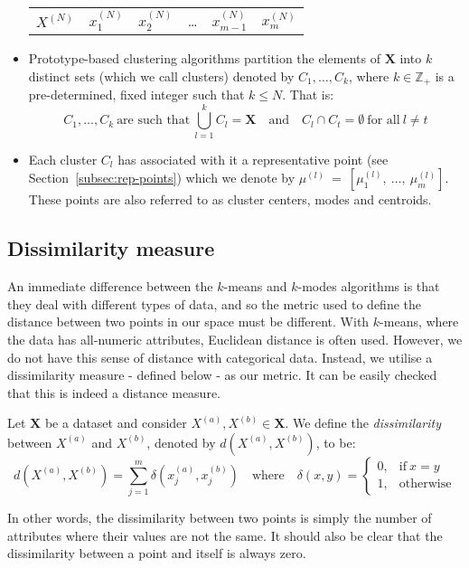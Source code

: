 \begin{itemize}
\begin{table}[H]
\begin{tabular}{cccccc}
            \(X^{(N)}\) & \(x_1^{(N)}\) & \(x_2^{(N)}\) & \quad \ldots \quad &
            \(x_{m-1}^{(N)}\) & \(x_m^{(N)}\)
            \\
        \end{tabular}
        \end{table}
	\item Prototype-based clustering algorithms partition the elements of 
        \(\textbf{X}\) into \(k\) distinct sets (which we call clusters) denoted
        by \(C_1, \ldots, C_k\), where \(k \in \mathbb{Z}_+\) is a 
        pre-determined, fixed integer such that \(k \le N\). That is:
	    \[
		    C_1, \ldots, C_k \ \text{are such that} \ \bigcup_{l=1}^k C_l = 
		    \textbf{X} \quad \text{and} \quad C_l \cap C_t = \emptyset \
		    \text{for all} \ l \neq t
	    \]
    \item Each cluster \(C_l\) has associated with it a representative point 
		(see Section~\ref{subsec:rep-points}) which we denote by 
        \(\mu^{(l)}~=~\left[\mu_1^{(l)},~\ldots,~\mu_m^{(l)}\right]\). These
        points are also referred to as cluster centers, modes and centroids.
\end{itemize}


\subsection{Dissimilarity measure}\label{subsec:dissim}

An immediate difference between the \(k\)-means and \(k\)-modes algorithms is 
that they deal with different types of data, and so the metric used to define 
the distance between two points in our space must be different. With 
\(k\)-means, where the data has all-numeric attributes, Euclidean distance is 
often used. However, we do not have this sense of distance with categorical 
data. Instead, we utilise a dissimilarity measure \-- defined below \-- as our 
metric. It can be easily checked that this is indeed a distance measure.

\begin{definition}\label{def:dissim}
    Let \(\textbf{X}\) be a dataset and consider \(X^{(a)}, X^{(b)} \in
    \textbf{X}\). We define the \emph{dissimilarity} between \(X^{(a)}\) and 
    \(X^{(b)}\), denoted by \(d(X^{(a)}, X^{(b)})\), to be:
    \[
        d(X^{(a)}, X^{(b)}) = \sum_{j=1}^{m} \delta(x_j^{(a)}, x_j^{(b)}) \quad
        \text{where} \quad \delta(x, y) = \begin{cases}
                                              0, & \text{if} \ x = y \\
			    		                      1, & \text{otherwise}
				    	                  \end{cases}
    \]

    In other words, the dissimilarity between two points is simply the number of
    attributes where their values are not the same. It should also be clear that
    the dissimilarity between a point and itself is always zero.
\end{definition}


